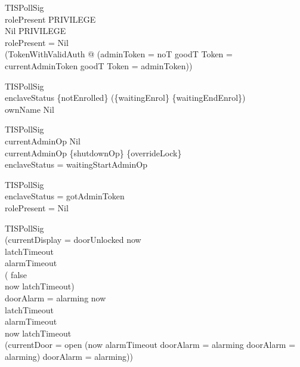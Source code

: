     TISPollSig \\
         \land rolePresent \in \power PRIVILEGE \\
         \land Nil \in \power PRIVILEGE \\
         \land \lnot rolePresent = Nil \\
\implies (\exists TokenWithValidAuth
            @ (\IF adminToken = noT
               \THEN goodT \theta Token = currentAdminToken
               \ELSE goodT \theta Token = adminToken))

TISPollSig \\
         \land enclaveStatus
               \notin \{notEnrolled\}
                      \cup (\{waitingEnrol\} \cup \{waitingEndEnrol\}) \\
\implies ownName \neq Nil

TISPollSig \\
         \land currentAdminOp \neq Nil \\
         \land \The currentAdminOp \in \{shutdownOp\} \cup \{overrideLock\} \\
\implies enclaveStatus = waitingStartAdminOp

  TISPollSig \\
         \land enclaveStatus = gotAdminToken \\
\implies rolePresent = Nil

    TISPollSig \\
\implies (\IF currentDisplay = doorUnlocked
          \THEN       now  \\
                \land latchTimeout  \\
                \land alarmTimeout  \\
                \land (     false \\
                       \iff now \geq latchTimeout) \\
                \land \lnot doorAlarm = alarming
          \ELSE       now  \\
                \land latchTimeout  \\
                \land alarmTimeout  \\
                \land now \geq latchTimeout \\
                \land (\IF currentDoor = open
                       \THEN (\IF now \geq alarmTimeout
                              \THEN doorAlarm = alarming
                              \ELSE \lnot doorAlarm = alarming)
                       \ELSE \lnot doorAlarm = alarming))

